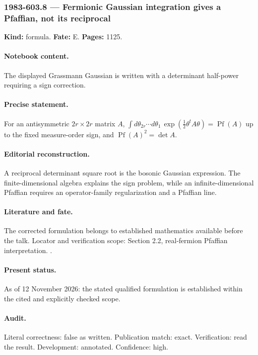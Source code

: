 \subsubsection{1983-603.8 --- Fermionic Gaussian integration gives a Pfaffian, not its reciprocal}

\label{item:1983-603.8}

\noindent\textbf{Kind:} formula. \textbf{Fate:} E. \textbf{Pages:} 1125.\par

\paragraph{Notebook content.} The displayed Grassmann Gaussian is written with a determinant half-power requiring a sign correction.

\paragraph{Precise statement.} For an antisymmetric \(2r\times2r\) matrix \(A\), \(\int d\theta_{2r}\cdots d\theta_1\,\exp(\frac12\theta^tA\theta)=\operatorname{Pf}(A)\) up to the fixed measure-order sign, and \(\operatorname{Pf}(A)^2=\det A\).

\paragraph{Editorial reconstruction.} A reciprocal determinant square root is the bosonic Gaussian expression. The finite-dimensional algebra explains the sign problem, while an infinite-dimensional Pfaffian requires an operator-family regularization and a Pfaffian line.

\paragraph{Literature and fate.} The corrected formulation belongs to established mathematics available before the talk. Locator and verification scope: Section 2.2, real-fermion Pfaffian interpretation. \cite{wangwenwitten2019new}.

\paragraph{Present status.} As of 12 November 2026: the stated qualified formulation is established within the cited and explicitly checked scope.

\paragraph{Audit.} Literal correctness: false as written. Publication match: exact. Verification: read the result. Development: annotated. Confidence: high.

